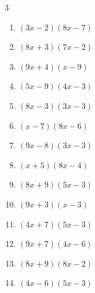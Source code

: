 \begin{multicols}{3}
\begin{enumerate}

  \item $(3x-2)(8x-7)$


  \item $(8x+3)(7x-2)$


  \item $(9x+4)(x-9)$


  \item $(5x-9)(4x-3)$


  \item $(8x-3)(3x-3)$


  \item $(x-7)(8x-6)$


  \item $(9x-8)(3x-3)$


  \item $(x+5)(8x-4)$


  \item $(8x+9)(5x-3)$


  \item $(9x+3)(x-3)$


\columnbreak %

  \item $(4x+7)(5x-3)$


  \item $(9x+7)(4x-6)$


  \item $(8x+9)(8x-2)$


  \item $(4x-6)(5x-3)$



\end{enumerate}
\end{multicols}
